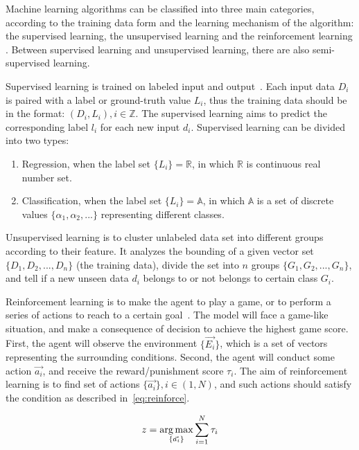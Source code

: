 \begin{spacing}{1.5}
Machine learning algorithms can be classified into three main categories, according to the training data form and the learning mechanism of the algorithm: the supervised learning, the unsupervised learning and the reinforcement learning \cite{mohri2018foundations}. Between supervised learning and unsupervised learning, there are also semi-supervised learning.

Supervised learning is trained on labeled input and output~\cite{sen2020supervised, kotsiantis2007supervised}. Each input data $D_i$ is paired with a label or ground-truth value $L_i$, thus the training data should be in the format: $(D_i, L_i), i \in \mathbb{Z}$. The supervised learning aims to predict the corresponding label $l_i$ for each new input $d_i$. Supervised learning can be divided into two types: 

\begin{enumerate}
    \item Regression, when the label set $\{L_i\} = \mathbb{R}$, in which $\mathbb{R}$ is continuous real number set.
    \item Classification, when the label set $\{L_i\} = \mathbb{A}$, in which $\mathbb{A}$ is a set of discrete values $\{\alpha_1, \alpha_2, ...\}$ representing different classes.
\end{enumerate}

Unsupervised learning is to cluster unlabeled data set into different groups according to their feature\cite{meena2019survey}. It analyzes the bounding of a given vector set $\{D_1, D_2, ...,D_n\}$ (the training data), divide the set into $n$ groups $\{G_1, G_2, ..., G_n\}$, and tell if a new unseen data $d_i$ belongs to or not belongs to certain class $G_i$.

Reinforcement learning is to make the agent to play a game, or to perform a series of actions to reach to a certain goal~\cite{barto2004reinforcement}. The model will face a game-like situation, and make a consequence of decision to achieve the highest game score. First, the agent will observe the environment $\{\vec{E_i}\}$, which is a set of vectors representing the surrounding conditions. Second, the agent will conduct some action $\vec{a_i}$, and receive the reward/punishment score $\tau_i$. The aim of reinforcement learning is to find set of actions $\{\vec{a_i}\}, i \in (1,N)$, and such actions should satisfy the condition as described in~\autoref{eq:reinforce}.

\begin{equation}
\label{eq:reinforce}
   z = \operatorname*{arg\,max}_{\{\vec{a_i}\}} \sum_{i=1}^{N} \tau_i
\end{equation}


\end{spacing}
